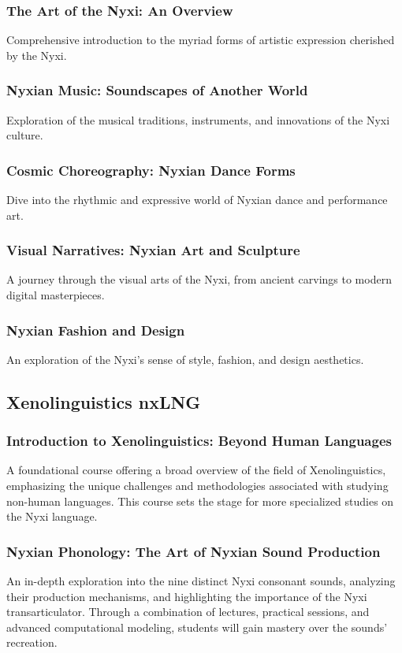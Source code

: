 \subsubsection{The Art of the Nyxi: An Overview}
Comprehensive introduction to the myriad forms of artistic expression cherished by the Nyxi.
\subsubsection{Nyxian Music: Soundscapes of Another World}
Exploration of the musical traditions, instruments, and innovations of the Nyxi culture.
\subsubsection{Cosmic Choreography: Nyxian Dance Forms}
Dive into the rhythmic and expressive world of Nyxian dance and performance art.
\subsubsection{Visual Narratives: Nyxian Art and Sculpture}
A journey through the visual arts of the Nyxi, from ancient carvings to modern digital masterpieces.
\subsubsection{Nyxian Fashion and Design}
An exploration of the Nyxi's sense of style, fashion, and design aesthetics.


\subsection{Xenolinguistics \hfill nxLNG}
\subsubsection{Introduction to Xenolinguistics: Beyond Human Languages}
A foundational course offering a broad overview of the field of Xenolinguistics, emphasizing the unique challenges and methodologies associated with studying non-human languages. This course sets the stage for more specialized studies on the Nyxi language.
\subsubsection{Nyxian Phonology: The Art of Nyxian Sound Production}
An in-depth exploration into the nine distinct Nyxi consonant sounds, analyzing their production mechanisms, and highlighting the importance of the Nyxi transarticulator. Through a combination of lectures, practical sessions, and advanced computational modeling, students will gain mastery over the sounds' recreation.
